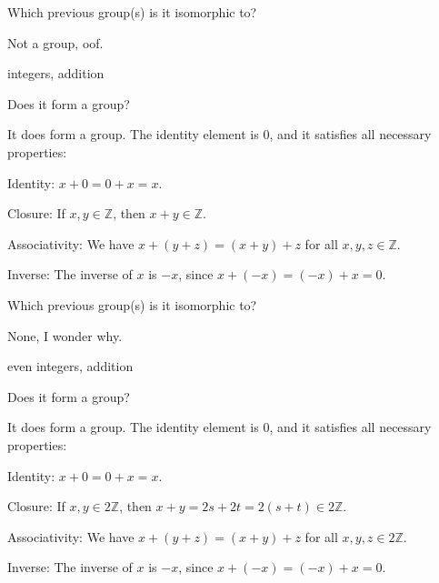 \documentclass[../key.tex]{subfiles}
\begin{document}
\begin{iinner_problem}
\item Which previous group(s) is it isomorphic to?
\end{iinner_problem}

\noindent Not a group, oof.

\begin{inner_problem}
\item integers, addition
\end{inner_problem}

\begin{iinner_problem}[start=1]
\item Does it form a group?
\end{iinner_problem}

\noindent It does form a group. The identity element is $0$, and it satisfies all necessary properties:

Identity: $x+0=0+x=x$.

Closure: If $x,y\in \mathbb{Z}$, then $x+y\in\mathbb{Z}$.

Associativity: We have $x+(y+z)=(x+y)+z$ for all $x,y,z\in\mathbb{Z}$.

Inverse: The inverse of $x$ is $-x$, since $x+(-x)=(-x)+x=0$.

\begin{iinner_problem}
\item Which previous group(s) is it isomorphic to?
\end{iinner_problem}

\noindent None, I wonder why.

\begin{inner_problem}
\item even integers, addition
\end{inner_problem}

\begin{iinner_problem}[start=1]
\item Does it form a group?
\end{iinner_problem}

\noindent It does form a group. The identity element is $0$, and it satisfies all necessary properties:

Identity: $x+0=0+x=x$.

Closure: If $x,y\in 2\mathbb{Z}$, then $x+y=2s+2t=2(s+t)\in 2\mathbb{Z}$.

Associativity: We have $x+(y+z)=(x+y)+z$ for all $x,y,z \in 2\mathbb{Z}$.

Inverse: The inverse of $x$ is $-x$, since $x+(-x)=(-x)+x=0$.
\end{document}
